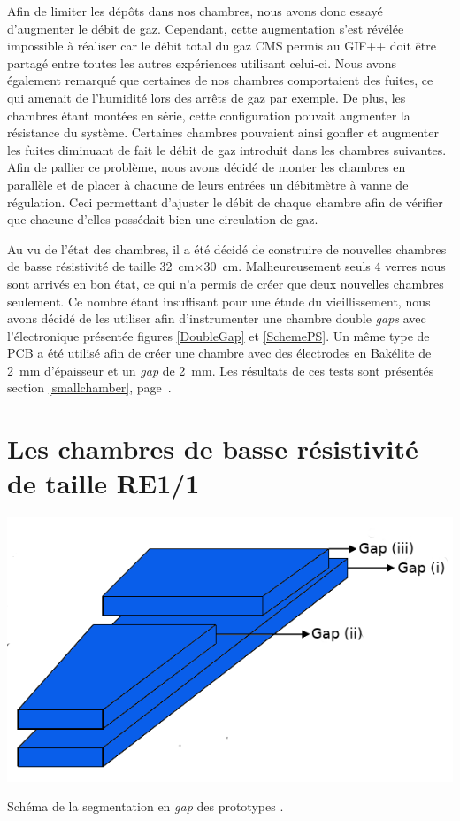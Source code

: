 Afin de limiter les dépôts dans nos chambres, nous avons donc essayé d'augmenter le débit de gaz. Cependant, cette augmentation s'est révélée impossible à réaliser car le débit total du gaz CMS permis au GIF++ doit être partagé entre toutes les autres expériences utilisant celui-ci.
Nous avons également remarqué que certaines de nos chambres comportaient des fuites, ce qui amenait de l'humidité lors des arrêts de gaz par exemple. De plus, les chambres étant montées en série, cette configuration pouvait augmenter la résistance du système. Certaines chambres pouvaient ainsi gonfler et augmenter les fuites diminuant de fait le débit de gaz introduit dans les chambres suivantes. Afin de pallier ce problème, nous avons décidé de monter les chambres en parallèle et de placer à chacune de leurs entrées un débitmètre à vanne de régulation. Ceci permettant d'ajuster le débit de chaque chambre afin de vérifier que chacune d'elles possédait bien une circulation de gaz.

Au vu de l'état des chambres, il a été décidé de construire de nouvelles chambres de basse résistivité de taille \SI{32}{\centi\meter}$\times$\SI{30}{\centi\meter}. Malheureusement seuls \num{4} verres nous sont arrivés en bon état, ce qui n'a permis de créer que deux nouvelles chambres seulement. Ce nombre étant insuffisant pour une étude du vieillissement, nous avons décidé de les utiliser afin d'instrumenter une chambre double \textit{gaps} avec l'électronique présentée figures \ref{DoubleGap} et \ref{SchemePS}. Un même type de PCB a été utilisé afin de créer une chambre avec des électrodes en Bakélite de \SI{2}{\milli\meter} d'épaisseur et un \textit{gap} de \SI{2}{\milli\meter}. Les résultats de ces tests sont présentés section \ref{smallchamber}, page~\pageref{smallchamber}.

\newpage
\section{Les chambres de basse résistivité de taille RE1/1}

\marginpar
{
	\centering
	\includegraphics[width=1.0\marginparwidth]{GLA/gaps.png}
	\captionsetup{type=figure}\caption{Schéma de la segmentation en \textit{gap} des prototypes \cite{gapss}.}
	\label{gap}
}

